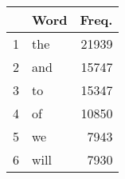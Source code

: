 \begin{table}[ht]
\centering
\begin{tabular}{rlr}
  \hline
 & Word & Freq. \\ 
  \hline
1 & the & 21939 \\ 
  2 & and & 15747 \\ 
  3 & to & 15347 \\ 
  4 & of & 10850 \\ 
  5 & we & 7943 \\ 
  6 & will & 7930 \\ 
   \hline
\end{tabular}
\end{table}
